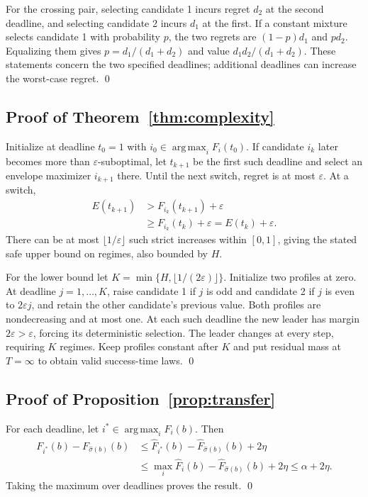 \documentclass[11pt]{article}
\theoremstyle{definition}\newtheorem{definition}[theorem]{Definition}
\newcommand{\eps}{\varepsilon}
\newcommand{\argmax}{\operatorname*{arg\,max}}
\begin{document}
For the crossing pair, selecting candidate 1 incurs regret $d_2$ at the second deadline, and selecting candidate 2 incurs $d_1$ at the first. If a constant mixture selects candidate 1 with probability $p$, the two regrets are $(1-p)d_1$ and $pd_2$. Equalizing them gives $p=d_1/(d_1+d_2)$ and value $d_1d_2/(d_1+d_2)$. These statements concern the two specified deadlines; additional deadlines can increase the worst-case regret. \qed

\subsection{Proof of Theorem~\ref{thm:complexity}}
Initialize at deadline $t_0=1$ with $i_0\in\argmax_iF_i(t_0)$. If candidate $i_k$ later becomes more than $\eps$-suboptimal, let $t_{k+1}$ be the first such deadline and select an envelope maximizer $i_{k+1}$ there. Until the next switch, regret is at most $\eps$. At a switch,
\begin{align}
 E(t_{k+1})&>F_{i_k}(t_{k+1})+\eps\\
 &\ge F_{i_k}(t_k)+\eps=E(t_k)+\eps.
\end{align}
There can be at most $\lfloor1/\eps\rfloor$ such strict increases within $[0,1]$, giving the stated safe upper bound on regimes, also bounded by $H$.

For the lower bound let $K=\min\{H,\lfloor1/(2\eps)\rfloor\}$. Initialize two profiles at zero. At deadline $j=1,\ldots,K$, raise candidate 1 if $j$ is odd and candidate 2 if $j$ is even to $2\eps j$, and retain the other candidate's previous value. Both profiles are nondecreasing and at most one. At each such deadline the new leader has margin $2\eps>\eps$, forcing its deterministic selection. The leader changes at every step, requiring $K$ regimes. Keep profiles constant after $K$ and put residual mass at $T=\infty$ to obtain valid success-time laws. \qed

\subsection{Proof of Proposition~\ref{prop:transfer}}
For each deadline, let $i^*\in\argmax_iF_i(b)$. Then
\begin{align}
 F_{i^*}(b)-F_{\widehat\sigma(b)}(b)
 &\le \widehat F_{i^*}(b)-\widehat F_{\widehat\sigma(b)}(b)+2\eta\\
 &\le \max_i\widehat F_i(b)-\widehat F_{\widehat\sigma(b)}(b)+2\eta
 \le\alpha+2\eta.
\end{align}
Taking the maximum over deadlines proves the result. \qed
\end{document}
